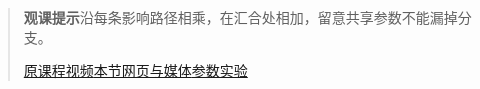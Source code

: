 \begin{quote}\small\textbf{观课提示}\quad 沿每条影响路径相乘，在汇合处相加，留意共享参数不能漏掉分支。

\href{https://www.youtube.com/watch?v=Ilg3gGewQ5U}{原课程视频}\quad\href{https://vitael04213.github.io/3blue1brown-notes/lessons/backpropagation.html}{本节网页与媒体}\quad\href{https://vitael04213.github.io/3blue1brown-notes/lab.html\#network}{参数实验}
\end{quote}
